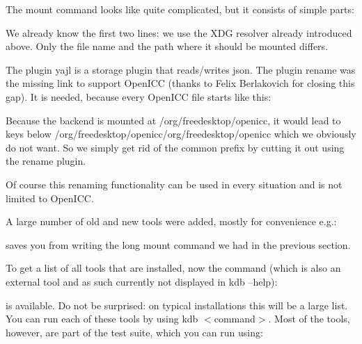 The mount command looks like quite complicated, but it consists of simple parts\+:


\begin{DoxyCode}{0}
\end{DoxyCode}


We already know the first two lines\+: we use the X\+DG resolver already introduced above. Only the file name and the path where it should be mounted differs.

The plugin yajl is a storage plugin that reads/writes json. The plugin rename was the missing link to support Open\+I\+CC (thanks to Felix Berlakovich for closing this gap). It is needed, because every Open\+I\+CC file starts like this\+:


\begin{DoxyCode}{0}
\end{DoxyCode}


Because the backend is mounted at /org/freedesktop/openicc, it would lead to keys below /org/freedesktop/openicc/org/freedesktop/openicc which we obviously do not want. So we simply get rid of the common prefix by cutting it out using the rename plugin.

Of course this renaming functionality can be used in every situation and is not limited to Open\+I\+CC.

A large number of old and new tools were added, mostly for convenience e.\+g.\+:


\begin{DoxyCode}{0}
\end{DoxyCode}


saves you from writing the long mount command we had in the previous section.

To get a list of all tools that are installed, now the command (which is also an external tool and as such currently not displayed in kdb --help)\+:


\begin{DoxyCode}{0}
\end{DoxyCode}


is available. Do not be surprised\+: on typical installations this will be a large list. You can run each of these tools by using kdb $<$command$>$. Most of the tools, however, are part of the test suite, which you can run using\+:


